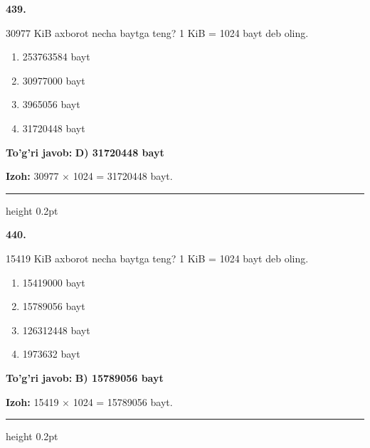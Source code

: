 \documentclass[10pt,a4paper,oneside]{article}
\begin{document}
\noindent\textbf{\color{ink}439.}
\par
30977 KiB axborot necha baytga teng? 1 KiB = 1024 bayt deb oling.
\begin{enumerate}[label=\Alph*),leftmargin=9mm]
\item 253763584 bayt
\item 30977000 bayt
\item 3965056 bayt
\item 31720448 bayt
\end{enumerate}
\begin{tcolorbox}[enhanced,breakable,colback=teal!4,colframe=teal!50!black,boxrule=0.5pt,arc=1.1mm,left=3mm,right=3mm,top=1.7mm,bottom=1.7mm,before skip=2mm,after skip=2mm]
\textbf{\color{teal}To'g'ri javob:} \textbf{D) 31720448 bayt}
\par\smallskip
\textbf{Izoh:} 30977 \ensuremath{\times} 1024 = 31720448 bayt.
\end{tcolorbox}
\vspace{2mm}\hrule height 0.2pt \vspace{3mm}

\noindent\textbf{\color{ink}440.}
\par
15419 KiB axborot necha baytga teng? 1 KiB = 1024 bayt deb oling.
\begin{enumerate}[label=\Alph*),leftmargin=9mm]
\item 15419000 bayt
\item 15789056 bayt
\item 126312448 bayt
\item 1973632 bayt
\end{enumerate}
\begin{tcolorbox}[enhanced,breakable,colback=teal!4,colframe=teal!50!black,boxrule=0.5pt,arc=1.1mm,left=3mm,right=3mm,top=1.7mm,bottom=1.7mm,before skip=2mm,after skip=2mm]
\textbf{\color{teal}To'g'ri javob:} \textbf{B) 15789056 bayt}
\par\smallskip
\textbf{Izoh:} 15419 \ensuremath{\times} 1024 = 15789056 bayt.
\end{tcolorbox}
\vspace{2mm}\hrule height 0.2pt \vspace{3mm}
\end{document}
